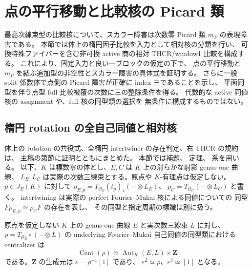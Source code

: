 \section{点の平行移動と比較核の Picard 類}
\label{sec:nfm-kernel-point-class}

最高次線束型の比較核について、スカラー障害は次数零 Picard 類
$m_P$ の表現障害である。
本節では体上の楕円因子比較を入力として相対核の分類を行い、
可換特殊ファイバーを含む非可換 active 商の相対 THCR/window1 比較を構成する。
これにより、固定入力と良い一ブロックの仮定の下で、
点の平行移動と $m_P$ を結ぶ追加型の非空性とスカラー障害の具体式を証明する。
さらに一般 split 係数体で点側の Picard 障害が正確に index 三であることを示し、
平面同型を伴う点型 full 比較被覆の次数に三の整除条件を得る。
代数的な active 同値核の assignment や、full 核の同型類の選択を
無条件に構成するものではない。

\subsection{楕円 rotation の全自己同値と相対核}

体上の rotation の共役式、全楕円 intertwiner の存在判定、右 THCR の規約は、
主稿の第節に証明とともにまとめた。
本節では補題、
定理、
系を用いる。
以下、$K$ は標数零の体とし、$E,C$ は $K$ 上の滑らかな射影 genus-one 曲線、
$L_E,L_C$ は実際の次数三線束とする。原点や $K$-有理点は仮定しない。
$p\in J_E(K)$ に対して
$\rho_{E,p}=T_{\mathcal O_E}(t_p)_*(-\otimes L_E)$、
$\rho_C=T_{\mathcal O_C}(-\otimes L_C)$ と書く。
intertwining は実際の perfect Fourier--Mukai 核による同値についての
同型 $F\rho_{E,p}\simeq\rho_CF$ の存在を表し、
その同型と指定周期の標識は別に扱う。

\begin{corollary}
\label{cor:nfm-elliptic-full-centralizer}
原点を仮定しない $K$ 上の genus-one 曲線 $E$ と実次数三線束 $L$ に対し、
$\rho=T_{\mathcal O_E}\circ(-\otimes L)$ の
underlying Fourier--Mukai 自己同値の同型類における centralizer は
\[
 \operatorname{Cent}(\rho)
 \simeq\operatorname{Aut}_K(E,L)\times\mathbf Z
\]
である。$\mathbf Z$ の生成元は $\varepsilon=\rho^{-1}[1]$ であり、
$\varepsilon^2\simeq\rho$、$\varepsilon^3\simeq[1]$ となる。
\end{corollary}

